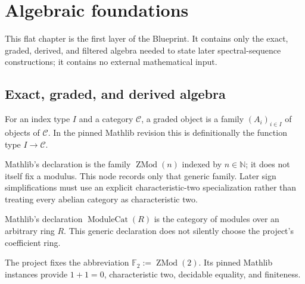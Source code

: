 \chapter{Algebraic foundations}
\label{chap:algebraic-foundations}

This flat chapter is the first layer of the Blueprint.  It contains only the exact, graded, derived, and filtered algebra needed to state later spectral-sequence constructions; it contains no external mathematical input.

\section{Exact, graded, and derived algebra}

\begin{definition}
  \label{def:mathlib-graded-object}
  \mathlibok
  For an index type $I$ and a category $\mathcal C$, a graded object is a
  family $(A_i)_{i\in I}$ of objects of $\mathcal C$.  In the pinned Mathlib
  revision this is definitionally the function type $I\to\mathcal C$.
\end{definition}

\begin{definition}
  \label{def:mathlib-f2}
  \mathlibok
  Mathlib's declaration is the family $\operatorname{ZMod}(n)$ indexed by
  $n\in\mathbb N$; it does not itself fix a modulus.  This node records only
  that generic family.  Later sign simplifications must use an explicit
  characteristic-two specialization rather than treating every abelian
  category as characteristic two.
\end{definition}

\begin{definition}
  \label{def:mathlib-f2-module-category}
  \mathlibok
  Mathlib's declaration $\operatorname{ModuleCat}(R)$ is the category of
  modules over an arbitrary ring $R$.  This generic declaration does not
  silently choose the project's coefficient ring.
\end{definition}

\begin{definition}
  \label{def:core-f2}
  \leanok
  The project fixes the abbreviation
  $\mathbb F_2:=\operatorname{ZMod}(2)$.  Its pinned Mathlib instances provide
  $1+1=0$, characteristic two, decidable equality, and finiteness.
\end{definition}

